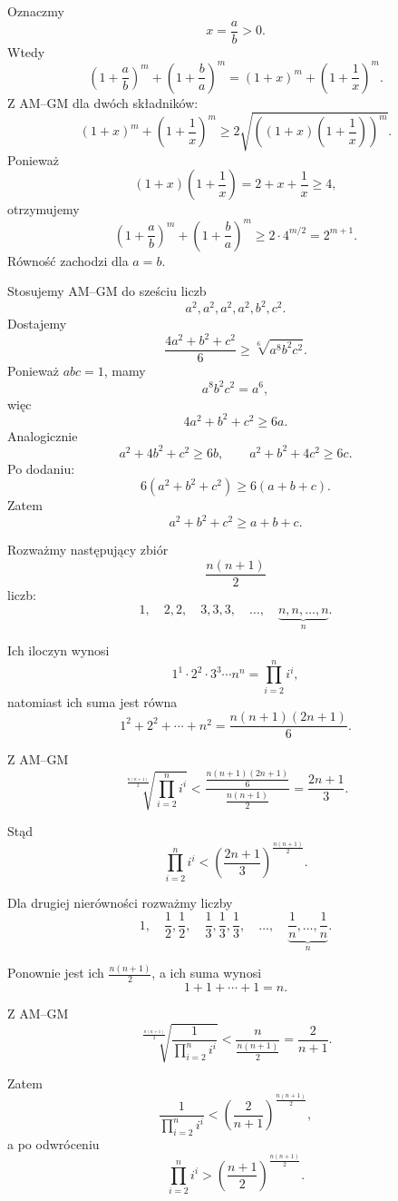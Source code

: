 \documentclass{lecture-kuznia}
\begin{document}
\begin{solution*}[\ref{Z10}]
	Oznaczmy
	\[
		x=\frac ab>0.
	\]
	Wtedy
	\[
		\left(1+\frac ab\right)^m+\left(1+\frac ba\right)^m
		=
		(1+x)^m+\left(1+\frac1x\right)^m.
	\]
	Z AM--GM dla dwóch składników:
	\[
		(1+x)^m+\left(1+\frac1x\right)^m
		\ge
		2\sqrt{
			\left((1+x)\left(1+\frac1x\right)\right)^m
		}.
	\]
	Ponieważ
	\[
		(1+x)\left(1+\frac1x\right)
		=
		2+x+\frac1x
		\ge4,
	\]
	otrzymujemy
	\[
		\left(1+\frac ab\right)^m+\left(1+\frac ba\right)^m
		\ge
		2\cdot4^{m/2}
		=
		2^{m+1}.
	\]
	Równość zachodzi dla $a=b$.
\end{solution*}

\begin{solution*}[\ref{Z11}]
	Stosujemy AM--GM do sześciu liczb
	\[
		a^2,a^2,a^2,a^2,b^2,c^2.
	\]
	Dostajemy
	\[
		\frac{4a^2+b^2+c^2}{6}
		\ge
		\sqrt[6]{a^8b^2c^2}.
	\]
	Ponieważ $abc=1$, mamy
	\[
		a^8b^2c^2=a^6,
	\]
	więc
	\[
		4a^2+b^2+c^2\ge6a.
	\]
	Analogicznie
	\[
		a^2+4b^2+c^2\ge6b,
		\qquad
		a^2+b^2+4c^2\ge6c.
	\]
	Po dodaniu:
	\[
		6(a^2+b^2+c^2)\ge6(a+b+c).
	\]
	Zatem
	\[
		a^2+b^2+c^2\ge a+b+c.
	\]
\end{solution*}

\begin{solution*}[\ref{Z12}]
	Rozważmy następujący zbiór
	\[
		\frac{n(n+1)}2
	\]
	liczb:
	\[
		1,\quad
		2,2,\quad
		3,3,3,\quad
		\dots,\quad
		\underbrace{n,n,\dots,n}_{n}.
	\]

	Ich iloczyn wynosi
	\[
		1^1\cdot2^2\cdot3^3\cdots n^n
		=
		\prod_{i=2}^n i^i,
	\]
	natomiast ich suma jest równa
	\[
		1^2+2^2+\cdots+n^2
		=
		\frac{n(n+1)(2n+1)}6.
	\]

	Z AM--GM
	\[
		\sqrt[\frac{n(n+1)}2]
		{\prod_{i=2}^n i^i}
		<
		\frac{
			\frac{n(n+1)(2n+1)}6
		}{
			\frac{n(n+1)}2
		}
		=
		\frac{2n+1}{3}.
	\]

	Stąd
	\[
		\prod_{i=2}^n i^i
		<
		\left(\frac{2n+1}{3}\right)^{\frac{n(n+1)}2}.
	\]

	Dla drugiej nierówności rozważmy liczby
	\[
		1,\quad
		\frac12,\frac12,\quad
		\frac13,\frac13,\frac13,\quad
		\dots,\quad
		\underbrace{\frac1n,\dots,\frac1n}_{n}.
	\]

	Ponownie jest ich $\frac{n(n+1)}2$, a ich suma wynosi
	\[
		1+1+\cdots+1=n.
	\]

	Z AM--GM
	\[
		\sqrt[\frac{n(n+1)}2]
		{
			\frac1{\prod_{i=2}^n i^i}
		}
		<
		\frac{n}{\frac{n(n+1)}2}
		=
		\frac2{n+1}.
	\]

	Zatem
	\[
		\frac1{\prod_{i=2}^n i^i}
		<
		\left(\frac2{n+1}\right)^{\frac{n(n+1)}2},
	\]
	a po odwróceniu
	\[
		\prod_{i=2}^n i^i
		>
		\left(\frac{n+1}{2}\right)^{\frac{n(n+1)}2}.
	\]
\end{solution*}
\end{document}
